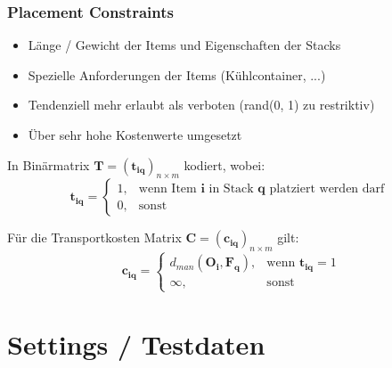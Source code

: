 \documentclass{beamer}
\begin{document}
\begin{frame}
\frametitle{Placement Constraints}
\begin{itemize}
    \item Länge / Gewicht der Items und Eigenschaften der Stacks
    \item Spezielle Anforderungen der Items (Kühlcontainer, ...)
    \item Tendenziell mehr erlaubt als verboten (rand(0, 1) zu restriktiv)
    \item Über sehr hohe Kostenwerte umgesetzt
\end{itemize}
In Binärmatrix $\boldsymbol{T} = (\boldsymbol{t_{iq}})_{n \times m}$ kodiert, wobei:
\[
    \boldsymbol{t_{iq}} =
\begin{cases}
    1, & \text{wenn Item $\boldsymbol{i}$ in Stack $\boldsymbol{q}$ platziert werden darf }\\
    0, & \text{sonst}
\end{cases}
\]

Für die Transportkosten Matrix $\boldsymbol{C} = (\boldsymbol{c_{iq}})_{n \times m}$ gilt:
\[
    \boldsymbol{c_{iq}} =
\begin{cases}
    d_{man}(\boldsymbol{O_i}, \boldsymbol{F_q}), & \text{wenn $\boldsymbol{t_{iq}} = 1$}\\
    \infty, & \text{sonst}
\end{cases}
\]
\end{frame}

\section{Settings / Testdaten}
\end{document}
